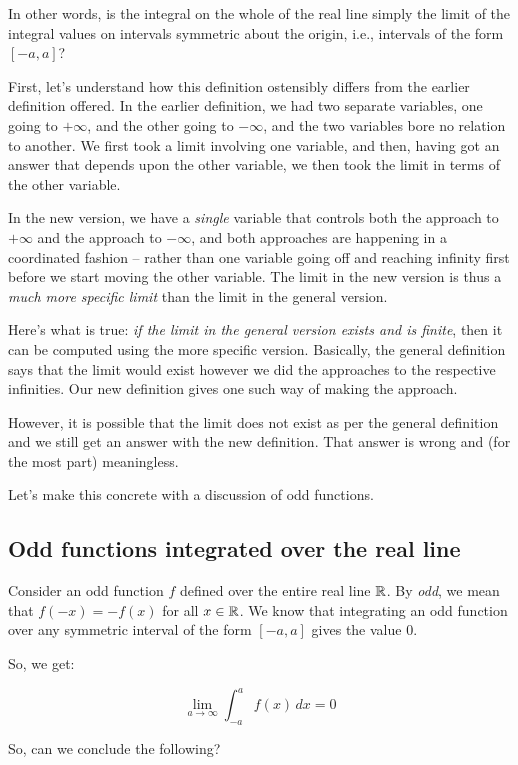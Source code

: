 \documentclass[10pt]{amsart}
\begin{document}
In other words, is the integral on the whole of the real line simply
the limit of the integral values on intervals symmetric about the
origin, i.e., intervals of the form $[-a,a]$?

First, let's understand how this definition ostensibly differs from
the earlier definition offered. In the earlier definition, we had two
separate variables, one going to $+\infty$, and the other going to
$-\infty$, and the two variables bore no relation to another. We first
took a limit involving one variable, and then, having got an answer
that depends upon the other variable, we then took the limit in terms
of the other variable.

In the new version, we have a {\em single} variable that controls both
the approach to $+\infty$ and the approach to $-\infty$, and both
approaches are happening in a coordinated fashion -- rather than one
variable going off and reaching infinity first before we start moving
the other variable. The limit in the new version is thus a {\em much
more specific limit} than the limit in the general version.

Here's what is true: {\em if the limit in the general version exists
and is finite}, then it can be computed using the more specific
version. Basically, the general definition says that the limit would
exist however we did the approaches to the respective infinities. Our
new definition gives one such way of making the approach.

However, it is possible that the limit does not exist as per the
general definition and we still get an answer with the new
definition. That answer is wrong and (for the most part) meaningless.

Let's make this concrete with a discussion of odd functions.

\subsection{Odd functions integrated over the real line}

Consider an odd function $f$ defined over the entire real line
$\mathbb{R}$. By {\em odd}, we mean that $f(-x) = -f(x)$ for all $x \in
\mathbb{R}$. We know that integrating an odd function over any symmetric
interval of the form $[-a,a]$ gives the value $0$.

So, we get:

$$\lim_{a \to \infty} \int_{-a}^a f(x) \, dx = 0$$

So, can we conclude the following?
\end{document}
